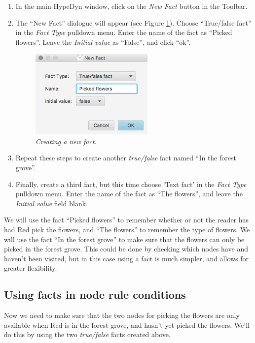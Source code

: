 \documentclass{article}
\begin{document}
\begin{enumerate}
  \item In the main HypeDyn window, click on the \textit{New Fact} button in the Toolbar. 
  \item The ``New Fact'' dialogue will appear (see Figure
  \ref{fig:tut3:newfact}). Choose ``True/false fact'' in the \textit{Fact Type} pulldown menu. Enter the name of the fact as ``Picked flowers''. Leave the \textit{Initial value} as ``False'', and click ``ok''.

\begin{figure}[h]
  \centering
  \includegraphics[width=6cm]{images/hypedyn-tutorial-3-figure-9}
  \caption{\textit{Creating a new fact.}}
  \label{fig:tut3:newfact}
\end{figure}

  \item Repeat these steps to create another \textit{true/false} fact named ``In the forest grove''.
  \item Finally, create a third fact, but this time choose `Text fact' in the \textit{Fact Type} pulldown menu. Enter the name of the fact as ``The flowers'', and leave the \textit{Initial value} field blank.
\end{enumerate}

We will use the fact ``Picked flowers'' to remember whether or not the reader has had Red pick the flowers, and ``The flowers'' to remember the type of flowers. We will use the fact ``In the forest grove'' to make sure that the flowers can only be picked in the forest grove. This could be done by checking which nodes have and haven't been visited, but in this case using a fact is much simpler, and allows for greater flexibility.

\subsection{Using facts in node rule conditions}

Now we need to make sure that the two nodes for picking the flowers are only available when Red is in the forest grove, and hasn't yet picked the flowers. We'll do this by using the two \textit{true/false} facts created above.
\end{document}
